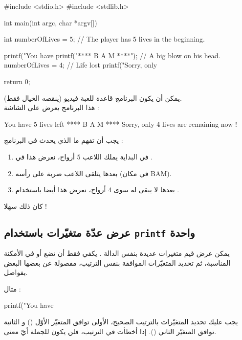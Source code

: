 \begin{Csource}
#include <stdio.h>
#include <stdlib.h>

int main(int argc, char *argv[])
{
  int numberOfLives = 5; // The player has 5 lives in the beginning.

  printf("You have %
  printf("**** B A M ****\n"); // A big blow on his head.
  numberOfLives = 4; // Life lost
  printf("Sorry, only %

  return 0;
}
\end{Csource}

يمكن أن يكون البرنامج قاعدة للعبة فيديو (ينقصه الخيال فقط).\\
هذا البرنامج يعرض على الشاشة :

\begin{Console}
You have 5 lives left
**** B A M ****
Sorry, only 4 lives are remaining now !

\end{Console}

يجب أن تفهم ما الذي يحدث في البرنامج :

\begin{enumerate}
  \item في البداية يملك اللاعب 5 أرواح، نعرض هذا في
.
  \item  بعدها يتلقى اللاعب ضربة على رأسه (في مكان
\textenglish{BAM}).
  \item بعدها لا يبقى له سوى 4 أرواح، نعرض هذا أيضا باستخدام
.
\end{enumerate}

كان ذلك سهلا !

\subsection{عرض عدّة متغيّرات باستخدام \texttt{printf} واحدة}

يمكن عرض قيم متغيرات عديدة بنفس الدالة
.
يكفي فقط أن تضع
أو
 في الأمكنة المناسبة، ثم تحديد المتغيّرات الموافقة بنفس الترتيب، مفصولة عن بعضها البعض بفواصل.

مثال :

\begin{Csource}
printf("You have %
\end{Csource}

\begin{warning}
  يجب عليك تحديد المتغيّرات بالترتيب الصحيح،
الأولى توافق المتغيّر الأوّل
()
و
الثانية توافق المتغيّر الثاني
().
إذا أخطأت في الترتيب، فلن يكون للجملة أيّ معنى.
\end{warning}

